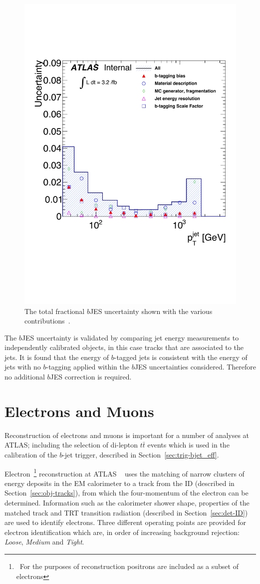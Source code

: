 \begin{figure}[!hbt]
  \begin{center}
    \includegraphics[width=0.45\linewidth, angle=0]{figs/Objects/bjets_bJES_uncert_edit.pdf}
  \vspace{-2em}
  \end{center}
  \caption[The total fractional $b$JES uncertainty shown with the various contributions.]
          {\label{fig:obj-bjets_bJES_uncert} The total fractional $b$JES uncertainty shown with the various contributions~\cite{dibjet-int_mori16}.}
\end{figure}

The $b$JES uncertainty is validated by comparing jet energy measurements to independently calibrated objects, in this case tracks that are associated to the jets.
It is found that the energy of $b$-tagged jets is consistent with the energy of jets with no $b$-tagging applied
within the $b$JES uncertainties considered. Therefore no additional $b$JES correction is required.

\section{Electrons and Muons}
\label{sec:obj-leptons}

Reconstruction of electrons and muons
is important for a number of analyses at ATLAS;
including the selection of di-lepton $t\bar{t}$ events
which is used in the calibration of  the $b$-jet trigger,
described in Section~\ref{sec:trig-bjet_eff}.

Electron~\footnote{\ For the purposes of reconstruction positrons are included as a subset of electrons}
reconstruction at ATLAS ~\cite{obj-electrons} uses
the matching of narrow clusters of energy deposits in the EM calorimeter
to a track from the ID (described in Section~\ref{sec:obj-tracks}),
from which the four-momentum of the electron can be determined.
Information such as the calorimeter shower shape,
properties of the matched track
and TRT transition radiation (described in Section~\ref{sec:det-ID})
are used to identify electrons.
Three different operating points are provided for electron identification
which are, in order of increasing background rejection:
\textit{Loose}, \textit{Medium} and \textit{Tight}. 

